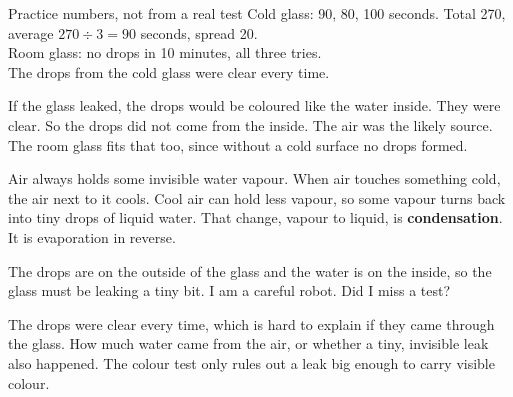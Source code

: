 \begin{worked}{Practice numbers, not from a real test}
Cold glass: 90, 80, 100 seconds. Total 270, average $270\div3=90$ seconds, spread 20.\\
Room glass: no drops in 10 minutes, all three tries.\\
The drops from the cold glass were clear every time.
\end{worked}

If the glass leaked, the drops would be coloured like the water inside. They were clear. So the drops did not come from the inside. The air was the likely source. The room glass fits that too, since without a cold surface no drops formed.

Air always holds some invisible water vapour. When air touches something cold, the air next to it cools. Cool air can hold less vapour, so some vapour turns back into tiny drops of liquid water. That change, vapour to liquid, is \textbf{condensation}. It is evaporation in reverse.

\clearpage

\begin{center}
\end{center}

\begin{multix}[hmm]\multixbot[hmm]\tcblower
The drops are on the outside of the glass and the water is on the inside, so the glass must be leaking a tiny bit. I am a careful robot. Did I miss a test?
\end{multix}

{The drops were clear every time, which is hard to explain if they came through the glass.}
{How much water came from the air, or whether a tiny, invisible leak also happened. The colour test only rules out a leak big enough to carry visible colour.}

